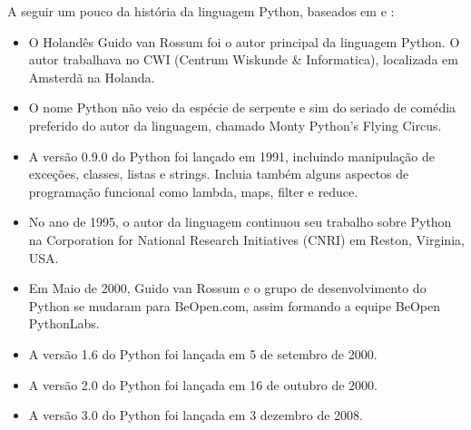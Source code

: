 A seguir um pouco da história da linguagem Python, baseados em \cite{Perkovic2016} e \cite{Borges2014} :
\begin{itemize}
  \item O Holandês Guido van Rossum foi o autor principal da linguagem Python. O autor trabalhava no CWI (Centrum Wiskunde \& Informatica), localizada em Amsterdã na Holanda.
  \item  O nome Python não veio da espécie de serpente e sim do seriado de comédia preferido do autor da linguagem, chamado Monty Python's Flying Circus.
  \item A versão 0.9.0 do Python foi lançado em 1991, incluindo manipulação de exceções, classes, listas e strings. Incluia também alguns aspectos de programação funcional como lambda, maps, filter e reduce.
  \item  No ano de 1995, o autor da linguagem continuou seu trabalho sobre Python na Corporation for National Research Initiatives (CNRI) em Reston, Virginia, USA.
  \item  Em Maio de 2000, Guido van Rossum e o grupo de desenvolvimento do Python se mudaram para BeOpen.com, assim formando a equipe BeOpen PythonLabs.
  \item A versão 1.6 do Python foi lançada em 5 de setembro de 2000.
  \item A versão 2.0  do Python foi lançada em 16 de outubro de 2000.
  \item A versão 3.0 do Python foi lançada em 3 dezembro de 2008.
\end{itemize}


